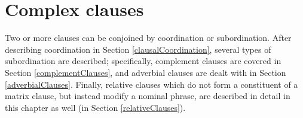 



\chapter{Complex clauses}\label{complexClauses}%
Two or more clauses can be conjoined by coordination or subordination. %
After describing coordination in Section \ref{clausalCoordination}, several types of subordination are described; specifically, complement clauses are covered in Section \ref{complementClauses}, and adverbial clauses are dealt with in Section \ref{adverbialClauses}. 
Finally, relative clauses which do not form a constituent of a matrix clause, but instead modify a nominal phrase, are described in detail in this chapter as well (in Section \ref{relativeClauses}). 


